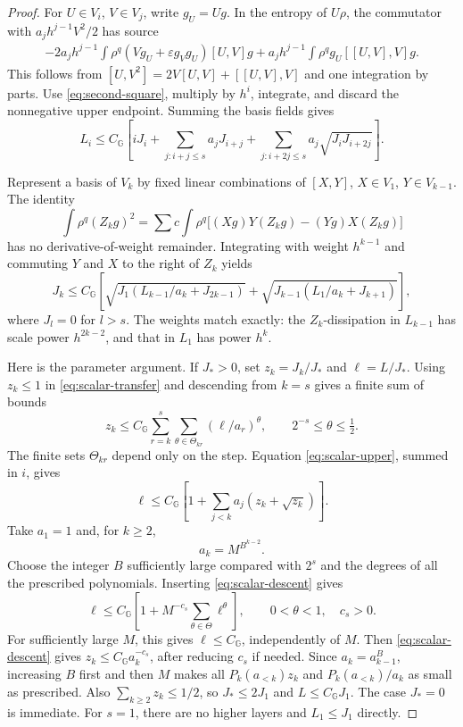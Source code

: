 \documentclass[11pt,a4paper]{amsart}
\numberwithin{equation}{section}
\theoremstyle{remark}\newtheorem{remark}[theorem]{Remark}
\newcommand{\G}{\mathbb G}
\newcommand{\eps}{\varepsilon}
\begin{document}
\begin{proof}
For $U\in V_i$, $V\in V_j$, write $g_U=Ug$. In the entropy of $U\rho$, the
commutator with $a_jh^{j-1}V^2/2$ has source
\begin{align}
 -2a_jh^{j-1}\int\rho^q
   (Vg_U+\eps g_Vg_U)[U,V]g
 +a_jh^{j-1}\int\rho^q g_U[[U,V],V]g.\label{eq:scalar-source}
\end{align}
This follows from $[U,V^2]=2V[U,V]+[[U,V],V]$ and one integration by parts.
Use \eqref{eq:second-square}, multiply by $h^i$, integrate, and discard the
nonnegative upper endpoint. Summing the basis fields gives
\begin{equation}\label{eq:scalar-upper}
 L_i\le C_\G\left[iJ_i+
 \sum_{j:i+j\le s}a_jJ_{i+j}+
 \sum_{j:i+2j\le s}a_j\sqrt{J_iJ_{i+2j}}\right].
\end{equation}

Represent a basis of $V_k$ by fixed linear combinations of
$[X,Y]$, $X\in V_1$, $Y\in V_{k-1}$. The identity
\[
 \int\rho^q(Z_kg)^2
 =\sum c\int\rho^q\big[(Xg)Y(Z_kg)-(Yg)X(Z_kg)\big]
\]
has no derivative-of-weight remainder. Integrating with weight $h^{k-1}$ and
commuting $Y$ and $X$ to the right of $Z_k$ yields
\begin{equation}\label{eq:scalar-transfer}
 J_k\le C_\G\left[
 \sqrt{J_1\left(L_{k-1}/a_k+J_{2k-1}\right)}+
 \sqrt{J_{k-1}\left(L_1/a_k+J_{k+1}\right)}\right],
\end{equation}
where $J_l=0$ for $l>s$. The weights match exactly: the $Z_k$-dissipation in
$L_{k-1}$ has scale power $h^{2k-2}$, and that in $L_1$ has power $h^k$.

Here is the parameter argument. If $J_*>0$, set $z_k=J_k/J_*$ and
$\ell=L/J_*$. Using $z_k\le1$ in \eqref{eq:scalar-transfer} and descending
from $k=s$ gives a finite sum of bounds
\begin{equation}\label{eq:scalar-descent}
 z_k\le C_\G\sum_{r=k}^s\sum_{\theta\in\Theta_{kr}}
       (\ell/a_r)^\theta,\qquad
 2^{-s}\le\theta\le\tfrac12.
\end{equation}
The finite sets $\Theta_{kr}$ depend only on the step. Equation
\eqref{eq:scalar-upper}, summed in $i$, gives
\[
 \ell\le C_\G\left[1+\sum_{j<k}a_j(z_k+\sqrt{z_k})\right].
\]
Take $a_1=1$ and, for $k\ge2$,
\begin{equation}\label{eq:hierarchy}
 a_k=M^{B^{k-2}}.
\end{equation}
Choose the integer $B$ sufficiently large compared with $2^s$ and the degrees
of all the prescribed polynomials. Inserting \eqref{eq:scalar-descent} gives
\[
 \ell\le C_\G\left[1+M^{-c_s}\sum_{\theta\in\Theta}\ell^\theta\right],
 \qquad 0<\theta<1,\quad c_s>0.
\]
For sufficiently large $M$, this gives $\ell\le C_\G$, independently of $M$.
Then \eqref{eq:scalar-descent} gives $z_k\le C_\G a_k^{-c_s}$, after reducing
$c_s$ if needed. Since $a_k=a_{k-1}^B$, increasing $B$ first and then $M$
makes all $P_k(a_{<k})z_k$ and $P_k(a_{<k})/a_k$ as small as prescribed.
Also $\sum_{k\ge2}z_k\le1/2$, so $J_*\le2J_1$ and
$L\le C_\G J_1$. The case $J_*=0$ is immediate. For $s=1$, there are no
higher layers and $L_1\le J_1$ directly.
\end{proof}
\end{document}
